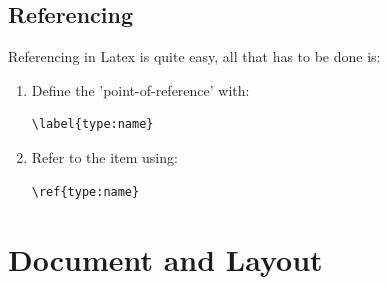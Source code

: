 \documentclass[12pt]{article}
\begin{document}
\subsection{Referencing}
Referencing in Latex is quite easy, all that has to be done is:
\begin{enumerate}
\item Define the 'point-of-reference' with: 
\begin{lstlisting}
\label{type:name}
\end{lstlisting}
\item Refer to the item using: 
\begin{lstlisting}
\ref{type:name}
\end{lstlisting}
\end{enumerate}
\newpage
\section{Document and Layout}
\end{document}
